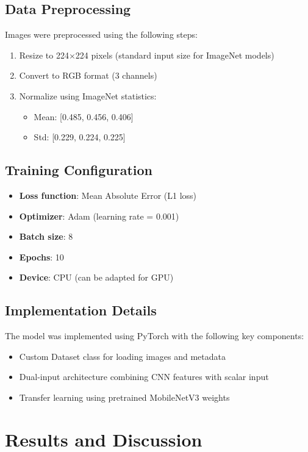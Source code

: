 \documentclass{article}
\begin{document}
\subsection{Data Preprocessing}
Images were preprocessed using the following steps:
\begin{enumerate}
    \item Resize to 224$\times$224 pixels (standard input size for ImageNet models)
    \item Convert to RGB format (3 channels)
    \item Normalize using ImageNet statistics:
    \begin{itemize}
        \item Mean: [0.485, 0.456, 0.406]
        \item Std: [0.229, 0.224, 0.225]
    \end{itemize}
\end{enumerate}

\subsection{Training Configuration}
\begin{itemize}
    \item \textbf{Loss function}: Mean Absolute Error (L1 loss)
    \item \textbf{Optimizer}: Adam (learning rate = 0.001)
    \item \textbf{Batch size}: 8
    \item \textbf{Epochs}: 10
    \item \textbf{Device}: CPU (can be adapted for GPU)
\end{itemize}

\subsection{Implementation Details}
The model was implemented using PyTorch with the following key components:
\begin{itemize}
    \item Custom Dataset class for loading images and metadata
    \item Dual-input architecture combining CNN features with scalar input
    \item Transfer learning using pretrained MobileNetV3 weights
\end{itemize}

\section{Results and Discussion}
\end{document}
